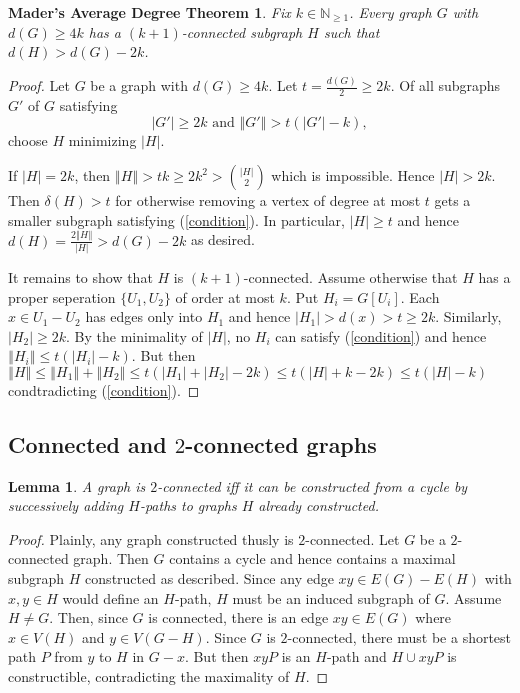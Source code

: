 \documentclass[12pt]{article}
\theoremstyle{plain}
\newtheorem{lem}[thm]{Lemma}
\newtheorem*{Mader}{Mader's Average Degree Theorem}
\theoremstyle{definition}
\theoremstyle{remark}
\newcommand{\card}[1]{\left|#1\right|}
\newcommand{\size}[1]{\left\Vert#1\right\Vert}
\begin{document}
\begin{Mader}
Fix $k \in \mathbb{N}_{\geq 1}$.  Every graph $G$ with $d(G) \geq 4k$ has a $(k+1)$-connected subgraph $H$ such that $d(H) > d(G) - 2k$.
\end{Mader}
\begin{proof}
Let $G$ be a graph with $d(G) \geq 4k$.  Let $t = \frac{d(G)}{2} \geq 2k$. Of all subgraphs $G'$ of $G$ satisfying
\begin{equation}\label{condition}
\card{G'} \geq 2k \text{ and } \size{G'} > t(\card{G'} - k),
\end{equation}
choose $H$ minimizing $\card{H}$.

If $\card{H} = 2k$, then $\size{H} > tk \geq 2k^2 > {\card{H} \choose 2}$ which is impossible.  Hence $\card{H} > 2k$. Then $\delta(H) > t$ for otherwise removing a vertex of degree at most $t$ gets a smaller subgraph satisfying (\ref{condition}).  In particular, $\card{H} \geq t$ and hence $d(H) = \frac{2\size{H}}{\card{H}} > d(G) - 2k$ as desired.

It remains to show that $H$ is $(k+1)$-connected.  Assume otherwise that $H$ has a proper seperation $\{U_1, U_2\}$ of order at most $k$.  Put $H_i = G[U_i]$.  Each $x \in U_1 - U_2$ has edges only into $H_1$ and hence $\card{H_1} > d(x) > t \geq 2k$.  Similarly, $\card{H_2} \geq 2k$.  By the minimality of $\card{H}$, no $H_i$ can satisfy (\ref{condition}) and hence $\size{H_i} \leq t(\card{H_i} - k)$.  But then $\size{H} \leq \size{H_1} + \size{H_2} \leq t(\card{H_1} + \card{H_2} - 2k) \leq t(\card{H} + k - 2k) \leq t(\card{H} - k)$ condtradicting (\ref{condition}).
\end{proof}

\subsection{Connected and $2$-connected graphs}
\begin{lem}
A graph is $2$-connected iff it can be constructed from a cycle by successively adding $H$-paths to graphs $H$ already constructed.
\end{lem}
\begin{proof}
Plainly, any graph constructed thusly is $2$-connected.  Let $G$ be a $2$-connected graph.  Then $G$ contains a cycle and hence contains a maximal subgraph $H$ constructed as described.  Since any edge $xy \in E(G) - E(H)$ with $x, y \in H$ would define an $H$-path, $H$ must be an induced subgraph of $G$.  Assume $H \neq G$.  Then, since $G$ is connected, there is an edge $xy \in E(G)$ where $x \in V(H)$ and $y \in V(G - H)$.  Since $G$ is $2$-connected, there must be a shortest path $P$ from $y$ to $H$ in $G - x$.  But then $xyP$ is an $H$-path and $H \cup xyP$ is constructible, contradicting the maximality of $H$.
\end{proof}
\end{document}
